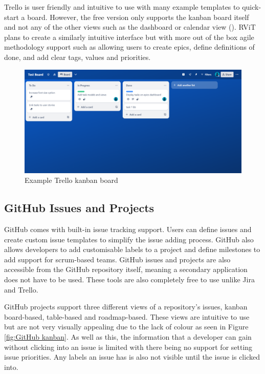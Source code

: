 \documentclass[l4proj.tex]{subfiles}
\begin{document}
Trello is user friendly and intuitive to use with many example templates to quick-start a board. However, the free version only supports the kanban board itself and not any of the other views such as the dashboard or calendar view (\cite{TrelloPricing}). RViT plans to create a similarly intuitive interface but with more out of the box agile methodology support such as allowing users to create epics, define definitions of done, and add clear tags, values and priorities.


\begin{figure}[h!]
\begin{center}
\includegraphics[scale=0.35]{dissertation/images/TrelloKanbanBoard.png}
\caption{Example Trello kanban board}
\label{fig:Trello kanban} 
\end{center}
\end{figure}

\subsection{GitHub Issues and Projects}
GitHub comes with built-in issue tracking support. Users can define issues and create custom issue templates to simplify the issue adding process. GitHub also allows developers to add customisable labels to a project and define milestones to add support for scrum-based teams. GitHub issues and projects are also accessible from the GitHub repository itself, meaning a secondary application does not have to be used. These tools are also completely free to use unlike Jira and Trello.


GitHub projects support three different views of a repository's issues, kanban board-based, table-based and roadmap-based. These views are intuitive to use but are not very visually appealing due to the lack of colour as seen in Figure \ref{fig:GitHub kanban}. As well as this, the information that a developer can gain without clicking into an issue is limited with there being no support for setting issue priorities. Any labels an issue has is also not visible until the issue is clicked into.
\end{document}

